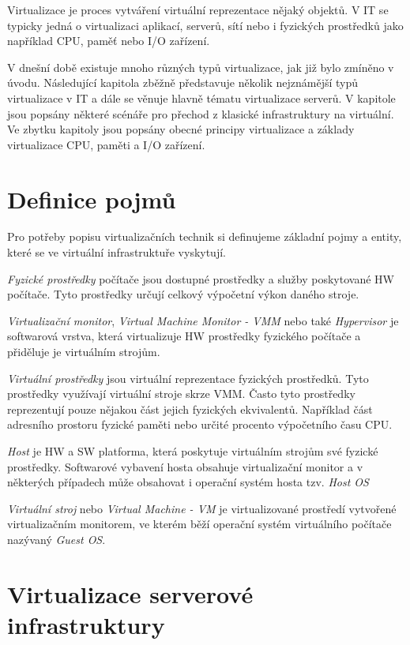 Virtualizace je proces vytváření virtuální reprezentace nějaký objektů. V IT se typicky jedná o virtualizaci aplikací, serverů, sítí nebo i fyzických prostředků jako například CPU, paměť nebo I/O zařízení.

V dnešní době existuje mnoho různých typů virtualizace, jak již bylo zmíněno v úvodu. Následující kapitola zběžně představuje několik nejznámější typů virtualizace v IT a dále se věnuje hlavně
tématu virtualizace serverů. V kapitole jsou popsány některé scénáře pro přechod z klasické infrastruktury na virtuální. Ve zbytku kapitoly jsou popsány obecné principy virtualizace a základy 
virtualizace CPU, paměti a I/O zařízení.

\section{Definice pojmů}
Pro potřeby popisu virtualizačních technik si definujeme základní pojmy a entity, které se ve virtuální infrastruktuře vyskytují.

\textit{Fyzické prostředky} počítače jsou dostupné prostředky a služby poskytované HW počítače. Tyto prostředky určují celkový výpočetní výkon daného stroje.

\textit{Virtualizační monitor}, \textit{Virtual Machine Monitor - VMM} nebo také \textit{Hypervisor} je softwarová vrstva, která virtualizuje HW prostředky fyzického počítače a přiděluje je
virtuálním strojům.

\textit{Virtuální prostředky} jsou virtuální reprezentace fyzických prostředků. Tyto prostředky využívají virtuální stroje skrze VMM. Často tyto prostředky reprezentují pouze nějakou část jejich fyzických ekvivalentů. Například 
část adresního prostoru fyzické paměti nebo určité procento výpočetního času CPU.

\textit{Host} je HW a SW platforma, která poskytuje virtuálním strojům své fyzické prostředky. Softwarové vybavení hosta obsahuje virtualizační
monitor a v některých případech může obsahovat i operační systém hosta tzv. \textit{Host OS}

\textit{Virtuální stroj} nebo \textit{Virtual Machine - VM} je virtualizované prostředí vytvořené virtualizačním monitorem, ve kterém běží operační systém virtuálního počítače nazývaný \textit{Guest OS}.

\section{Virtualizace serverové infrastruktury}

